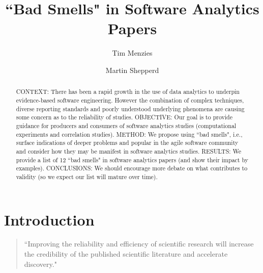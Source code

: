 \documentclass[preprint,10pt]{elsarticle}
\newcommand{\RED}{\color{red}}
\newcommand{\BLACK}{\color{black}}
\begin{document}
\begin{frontmatter}

\title{``Bad Smells" in Software Analytics Papers}
\author{Tim Menzies}
\address{Dept.\ of Computer Science\\North Carolina State University, USA}
\author{Martin Shepperd}
\address{Brunel Software Engineering Lab (BSEL)\\Dept.\ of Computer Science\\Brunel University London\\ UB8 3PH, UK}


\begin{abstract}
CONTEXT:  There has been a rapid growth in the use of data analytics to underpin evidence-based software engineering.  However the combination of complex techniques, diverse reporting standards and poorly understood underlying phenomena are causing some concern as to the reliability of studies.\newline
OBJECTIVE: Our goal is to provide guidance for producers and consumers of software analytics studies (computational experiments and correlation studies).\newline
METHOD: We propose using ``bad smells", i.e., surface indications of deeper problems and popular in the agile software community and consider how they may be manifest in software analytics studies.\newline
RESULTS: We provide a list of 12 ``bad smells" in software analytics papers (and show their impact by examples).\newline 
CONCLUSIONS: We should encourage more debate on what  \RED contributes to validity \BLACK  (so we expect our list will mature over time).
\end{abstract}

\end{frontmatter}

\maketitle

\section{Introduction}

\begin{quote}
``Improving the reliability and efficiency of scientific research will increase the credibility of the published scientific literature and accelerate discovery."  \cite{Muna17}
\end{quote}
\end{document}
